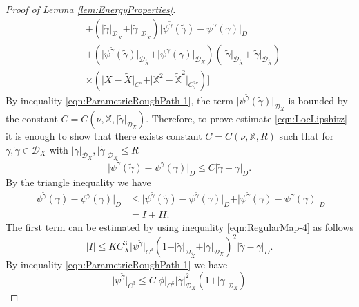 \documentclass[11pt,a4paper,leqno]{amsart}%
\theoremstyle{plain}
\theoremstyle{remark}
\theoremstyle{plain}
\numberwithin{equation}{section}
\begin{document}
\begin{proof}[ Proof of Lemma \ref{lem:EnergyProperties}]
\begin{align*}
&+(\vert \tilde{\gamma}\vert_{\mathcal{D}_{\tilde{X}}}+\vert \tilde{\gamma}\vert_{\mathcal{D}_{\tilde{X}}})\vert \psi^{\tilde{\gamma}}(\tilde{\gamma})-\psi^{\gamma}(\gamma)\vert_D\\
&+(\vert \psi^{\tilde{\gamma}}(\tilde{\gamma})\vert_{\mathcal{D}_{\tilde{X}}}+
\vert \psi^{\gamma}(\gamma)\vert_{\mathcal{D}_X})(\vert \tilde{\gamma}\vert_{\mathcal{D}_{\tilde{X}}}+\vert \tilde{\gamma}\vert_{\mathcal{D}_{\tilde{X}}})\\
&\times(\vert X-\tilde{X}\vert_{C^{\nu}}+\vert \mathbb{X}^2-\mathbb{\tilde{X}}^2\vert_{C_2^{2\nu}})\Big]
\end{align*}
By
inequality \eqref{eqn:ParametricRoughPath-1}, the term $\vert \psi^{\tilde{\gamma}}(\tilde{\gamma})\vert_{\mathcal{D}_X}$ is
bounded by the constant
$C=C(\nu,\mathbb{X},\vert \tilde{\gamma}\vert_{\mathcal{D}_X})$. Therefore, to prove
estimate \eqref{eqn:LocLipshitz} it is enough to show that there
exists constant $C=C(\nu,\mathbb{X},R)$ such that for
$\gamma,\tilde{\gamma}\in\mathcal{D}_X$ with
$\vert \gamma\vert_{\mathcal{D}_X},\vert \tilde{\gamma}\vert_{\mathcal{D}_X}\leq R$
\begin{equation}
\vert \psi^{\tilde{\gamma}}(\tilde{\gamma})-\psi^{\gamma}(\gamma)\vert_D\leq
C\vert \tilde{\gamma}-\gamma\vert_D.\label{eqn:EnergyLocLip-6}
\end{equation}
By the triangle inequality we have
\begin{align}
\vert \psi^{\tilde{\gamma}}(\tilde{\gamma})-\psi^{\gamma}(\gamma)\vert_D
&\leq\vert \psi^{\tilde{\gamma}}(\tilde{\gamma})-\psi^{\tilde{\gamma}}(\gamma)\vert_D+
\vert \psi^{\tilde{\gamma}}(\gamma)-\psi^{\gamma}(\gamma)\vert_D\nonumber\\
&=I+II.\label{eqn:EnergyLocLip-7}
\end{align}
The first term can be estimated by using inequality
\eqref{eqn:RegularMap-4} as follows
\begin{equation}
\vert I\vert \leq
KC_X^3\vert \psi^{\tilde{\gamma}}\vert_{C^3}(1+\vert \tilde{\gamma}\vert_{\mathcal{D}_{\tilde{X}}}+
\vert \gamma\vert_{\mathcal{D}_X})^2\vert \tilde{\gamma}-\gamma\vert_D.\label{eqn:EnergyLocLip-8}
\end{equation}
By inequality \eqref{eqn:ParametricRoughPath-1} we have
\begin{equation}
\vert \psi^{\tilde{\gamma}}\vert_{C^3}\leq
C\vert \phi\vert_{C^5}\vert \tilde{\gamma}\vert_{\mathcal{D}_X}^2(1+\vert \tilde{\gamma}\vert_{\mathcal{D}_X})\label{eqn:EnergyLocLip-8'}
\end{equation}

\end{proof}
\end{document}
